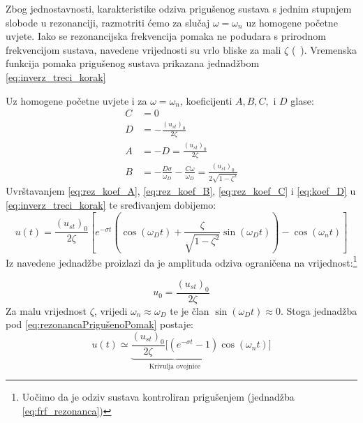 Zbog jednostavnosti, karakteristike odziva prigušenog sustava s jednim stupnjem
slobode u rezonanciji, razmotriti ćemo za slučaj $\omega = \omega_n$ uz
homogene početne uvjete. Iako se rezonancijska frekvencija pomaka ne podudara s 
prirodnom frekvencijom sustava, navedene vrijednosti su vrlo bliske za mali $\zeta$ (~\cite{chopra2011}). 
Vremenska funkcija pomaka prigušenog sustava prikazana jednadžbom \eqref{eq:inverz_treci_korak}

Uz homogene početne uvjete i za $\omega=\omega_n$, koeficijenti $A,B,C,\text{ i }D$
glase:
\begin{align}
    C &= 0 \label{eq:rez_koef_C}\\
    D &= -\frac{(u_{st})_0}{2\zeta}\label{eq:rez_koef_D}\\
    A &= -D = \frac{(u_{st})_0}{2\zeta}\label{eq:rez_koef_A}\\
    B &= -\frac{D\sigma}{\omega_D}-\frac{C\omega}{\omega_D}=
          \frac{(u_{st})_0}{2\sqrt{1-\zeta^2}}\label{eq:rez_koef_B}
\end{align}
Uvrštavanjem \eqref{eq:rez_koef_A}, \eqref{eq:rez_koef_B}, \eqref{eq:rez_koef_C} i \eqref{eq:koef_D}
u \eqref{eq:inverz_treci_korak} te sređivanjem dobijemo:
\begin{equation}\label{eq:rezonancaPrigušenoPomak}
    u(t)=\frac{(u_{st})_0}{2\zeta}\left[
        e^{-\sigma t} \left(
            \cos(\omega_D t)+\frac{\zeta}{\sqrt{1-\zeta^2}}\sin(\omega_D t)
            \right)
        -\cos(\omega_n t)
        \right]
\end{equation}
Iz navedene jednadžbe proizlazi da je amplituda odziva ograničena na
vrijednost:\footnote{Uočimo da je odziv sustava kontroliran prigušenjem (jednadžba \eqref{eq:frf_rezonanca})}

\begin{equation}\label{eq:rezonanca_amplituda}
    u_0=\frac{(u_{st})_0}{2\zeta}
\end{equation}
Za malu vrijednost $\zeta$, vrijedi $\omega_n\approx\omega_D$ te je član
$\sin(\omega_Dt) \approx 0$. Stoga jednadžba pod \eqref{eq:rezonancaPrigušenoPomak}
postaje:
\begin{equation}\label{eq:rezonancaOdzivAproksimacija}
    u(t)\simeq\underbrace{
        \frac{(u_{st})_0}{2\zeta}[(e^{-\sigma t}-1)
        }_{\text{Krivulja ovojnice}}
        \cos(\omega_nt)]
\end{equation}

